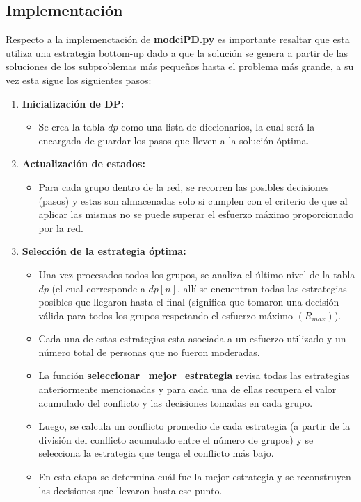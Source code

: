\subsection{Implementación}
    Respecto a la implemenctación de \textbf{modciPD.py} es importante resaltar que esta utiliza una estrategia bottom-up dado a que la solución se genera  a partir de las soluciones de los subproblemas más pequeños hasta el problema más grande, a su vez esta sigue los siguientes pasos:
    \begin{enumerate}
     
    \item \textbf{Inicialización de DP:}
    \begin{itemize}
        \item Se crea la tabla $dp$ como una lista de diccionarios, la cual será la encargada de guardar los pasos que lleven a la solución óptima.
        
    \end{itemize}
    
    \item \textbf{Actualización de estados:}
    \begin{itemize}
        \item Para cada grupo dentro de la red, se recorren las posibles decisiones (pasos) y estas son almacenadas solo si cumplen con el criterio de que al aplicar las mismas no se puede superar el esfuerzo máximo proporcionado por la red. 
    \end{itemize}
    
    \item \textbf{Selección de la estrategia óptima:}
     \begin{itemize}
        \item Una vez procesados todos los grupos, se analiza el último nivel de la tabla $dp$ (el cual corresponde a $dp[n]$, allí se encuentran todas las estrategias posibles que llegaron hasta el final (significa que tomaron una decisión válida para todos los grupos respetando el esfuerzo máximo $(R_{max})$).
        \item Cada una de estas estrategias esta asociada a un esfuerzo utilizado y un número total de personas que no fueron moderadas.
        \item La función \textbf{seleccionar\_mejor\_estrategia} revisa todas las estrategias anteriormente mencionadas y para cada una de ellas recupera el valor acumulado del conflicto y las decisiones tomadas en cada grupo.
        \item Luego, se calcula un conflicto promedio de cada estrategia (a partir de la división del conflicto acumulado entre el número de grupos) y se selecciona la estrategia que tenga el conflicto más bajo.
        \item En esta etapa se determina cuál fue la mejor estrategia y se reconstruyen las decisiones que llevaron hasta ese punto.
    \end{itemize}    
\end{enumerate}
